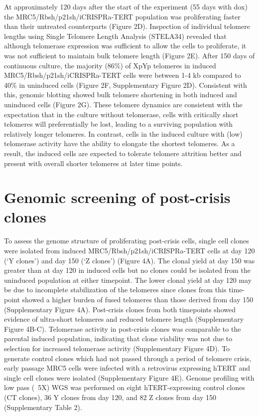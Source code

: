 \documentclass[phd,tocprelim]{cornell}
\begin{document}
At approximately 120 days after the start of the experiment (55 days with dox) the MRC5/Rbsh/p21sh/iCRISPRa-TERT population was proliferating faster than their untreated counterparts (Figure 2D). Inspection of individual telomere lengths using Single Telomere Length Analysis (STELA34) revealed that although telomerase expression was sufficient to allow the cells to proliferate, it was not sufficient to maintain bulk telomere length (Figure 2E). After 150 days of continuous culture, the majority (86\%) of XpYp telomeres in induced MRC5/Rbsh/p21sh/iCRISPRa-TERT cells were between 1-4 kb compared to 40\% in uninduced cells (Figure 2F, Supplementary Figure 2D). Consistent with this, genomic blotting showed bulk telomere shortening in both induced and uninduced cells (Figure 2G). These telomere dynamics are consistent with the expectation that in the culture without telomerase, cells with critically short telomeres will preferentially be lost, leading to a surviving population with relatively longer telomeres. In contrast, cells in the induced culture with (low) telomerase activity have the ability to elongate the shortest telomeres. As a result, the induced cells are expected to tolerate telomere attrition better and present with overall shorter telomeres at later time points. 

\section{Genomic screening of post-crisis clones}
To assess the genome structure of proliferating post-crisis cells, single cell clones were isolated from induced MRC5/Rbsh/p21sh/iCRISPRa-TERT cells at day 120 (‘Y clones’) and day 150 (‘Z clones’) (Figure 4A). The clonal yield at day 150 was greater than at day 120 in induced cells but no clones could be isolated from the uninduced population at either timepoint. The lower clonal yield at day 120 may be due to incomplete stabilization of the telomeres since clones from this time-point showed a higher burden of fused telomeres than those derived from day 150 (Supplementary Figure 4A). Post-crisis clones from both timepoints showed evidence of ultra-short telomeres and reduced telomere length (Supplementary Figure 4B-C). Telomerase activity in post-crisis clones was comparable to the parental induced population, indicating that clone viability was not due to selection for increased telomerase activity (Supplementary Figure 4D). To generate control clones which had not passed through a period of telomere crisis, early passage MRC5 cells were infected with a retrovirus expressing hTERT and single cell clones were isolated (Supplementary Figure 4E). Genome profiling with low pass (~5X) WGS was performed on eight hTERT-expressing control clones (CT clones), 36 Y clones from day 120, and 82 Z clones from day 150 (Supplementary Table 2). 
\end{document}
